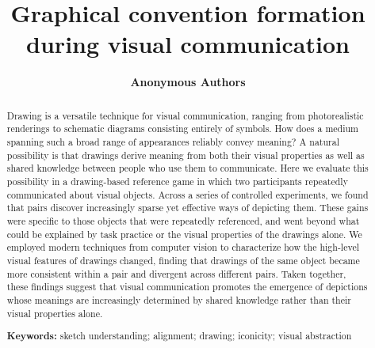 \documentclass[10pt,letterpaper]{article}
\title{Graphical convention formation during visual communication}
\author{\large \bf Anonymous Authors}
\begin{document}
\maketitle

\begin{abstract}
Drawing is a versatile technique for visual communication, ranging from photorealistic renderings to schematic diagrams consisting entirely of symbols. 
How does a medium spanning such a broad range of appearances reliably convey meaning?
A natural possibility is that drawings derive meaning from both their visual properties as well as shared knowledge between people who use them to communicate. 
Here we evaluate this possibility in a drawing-based reference game in which two participants repeatedly communicated about visual objects.
Across a series of controlled experiments, we found that pairs discover increasingly sparse yet effective ways of depicting them. 
These gains were specific to those objects that were repeatedly referenced, and went beyond what could be explained by task practice or the visual properties of the drawings alone. 
We employed modern techniques from computer vision to characterize how the high-level visual features of drawings changed, finding that drawings of the same object became more consistent within a pair and divergent across different pairs.
Taken together, these findings suggest that visual communication promotes the emergence of depictions whose meanings are increasingly determined by shared knowledge rather than their visual properties alone.

\textbf{Keywords:}
sketch understanding; alignment; drawing; iconicity; visual abstraction


\end{abstract}
\end{document}

